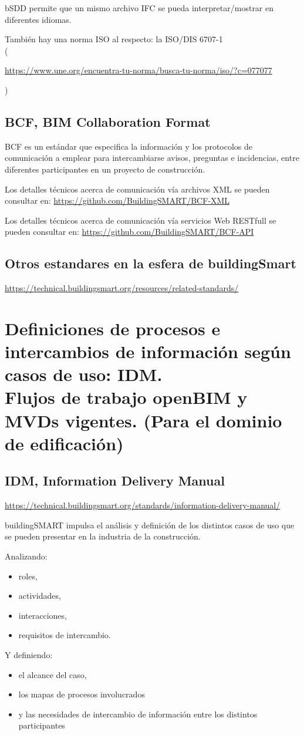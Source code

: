\documentclass[spanish,10pt,a4paper,final,oneside]{article}
\begin{document}
bSDD permite que un mismo archivo IFC se pueda interpretar/mostrar en diferentes idiomas.

También hay una norma ISO al respecto: la ISO/DIS 6707-1
\\(\begin{tiny}\url{https://www.une.org/encuentra-tu-norma/busca-tu-norma/iso/?c=077077}\end{tiny})

\subsection{\textbf{BCF}, {\small BIM} Collaboration Format}
BCF es un estándar que especifica la información y los protocolos de comunicación a emplear para intercambiarse avisos, preguntas e incidencias, entre diferentes participantes en un proyecto de construcción. 

Los detalles técnicos acerca de comunicación vía archivos XML se pueden consultar en: \url{https://github.com/BuildingSMART/BCF-XML}

Los detalles técnicos acerca de comunicación vía servicios Web RESTfull se pueden consultar en: \url{https://github.com/BuildingSMART/BCF-API}


\subsection{Otros estandares en la esfera de buildingSmart}
\url{https://technical.buildingsmart.org/resources/related-standards/}



\newpage
\section{Definiciones de procesos e intercambios de información según casos de uso: IDM. \\Flujos de trabajo openBIM y MVDs vigentes. (Para el dominio de edificación)}


\subsection{IDM, Information Delivery Manual}
\url{https://technical.buildingsmart.org/standards/information-delivery-manual/}

buildingSMART impulsa el análisis y definición de los distintos casos de uso que se pueden presentar en la industria de la construcción.

Analizando:
\begin{itemize}
\item roles, 
\item actividades, 
\item interacciones, 
\item requisitos de intercambio.
\end{itemize}
Y definiendo:
\begin{itemize}
\item el alcance del caso, 
\item los mapas de procesos involucrados
\item y las necesidades de intercambio de información entre los distintos participantes
\end{itemize}
\end{document}
